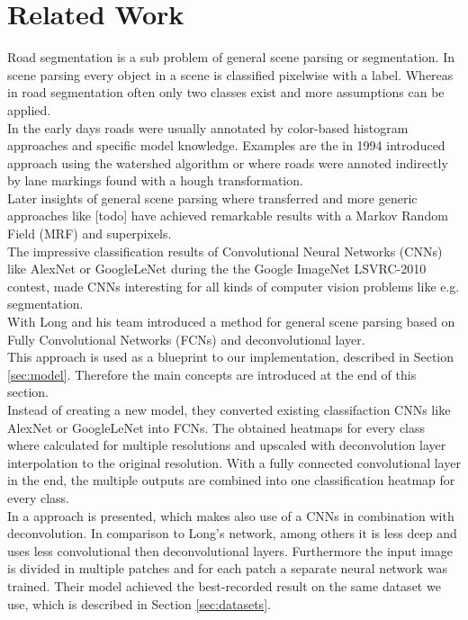 
\section{Related Work}\label{sec:related-work}
Road segmentation is a sub problem of general scene parsing or segmentation. In scene parsing every object in a scene is classified pixelwise with a label. Whereas in road segmentation often only two classes exist and more assumptions can be applied.\\
In the early days roads were usually annotated by color-based histogram approaches and specific model knowledge. Examples are the in 1994 introduced approach \cite{Beucher1990} using the watershed algorithm or \cite{aly2008real} where roads were annoted indirectly by lane markings found with a hough transformation.\\
Later insights of general scene parsing where transferred and more generic approaches like [todo] have achieved remarkable results with a Markov Random Field (MRF) and superpixels.\\
The impressive classification results of Convolutional Neural Networks (CNNs) like AlexNet \cite{krizhevsky2012imagenet} or GoogleLeNet \cite{SzegedyLJSRAEVR14} during the the Google ImageNet LSVRC-2010 contest, made CNNs interesting for all kinds of computer vision problems like e.g. segmentation. \\
With \cite{long2014fully} Long and his team introduced a method for general scene parsing based on Fully Convolutional Networks (FCNs) and deconvolutional layer.\\
This approach is used as a blueprint to our implementation, described in Section \ref{sec:model}. Therefore the main concepts are introduced at the end of this section.\\
Instead of creating a new model, they converted existing classifaction CNNs like AlexNet or GoogleLeNet into FCNs. The obtained heatmaps for every class where calculated for multiple resolutions and upscaled with deconvolution layer interpolation to the original resolution.
With a fully connected convolutional layer in the end, the multiple outputs are combined into one classification heatmap for every class.\\

In \cite{mohan2014deep} a approach is presented, which makes also use of a CNNs in combination with deconvolution. In comparison to Long's network, among others it is less deep and uses less convolutional then deconvolutional layers. Furthermore the input image is divided in multiple patches and for each patch a separate neural network was trained. Their model achieved the best-recorded result on the same dataset we use, which is described in Section \ref{sec:datasets}.    

